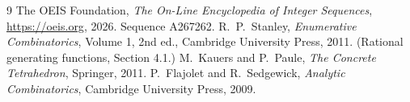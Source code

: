 \documentclass[11pt,a4paper]{article}
\theoremstyle{plain}
\theoremstyle{definition}
\begin{document}
\begin{thebibliography}{9}
 The OEIS Foundation, \emph{The On-Line Encyclopedia of Integer
Sequences}, \url{https://oeis.org}, 2026. Sequence A267262.
 R.~P.~Stanley, \emph{Enumerative Combinatorics}, Volume 1, 2nd ed.,
Cambridge University Press, 2011. (Rational generating functions, Section 4.1.)
 M.~Kauers and P.~Paule, \emph{The Concrete Tetrahedron}, Springer, 2011.
 P.~Flajolet and R.~Sedgewick, \emph{Analytic Combinatorics}, Cambridge
University Press, 2009.
\end{thebibliography}
\end{document}
